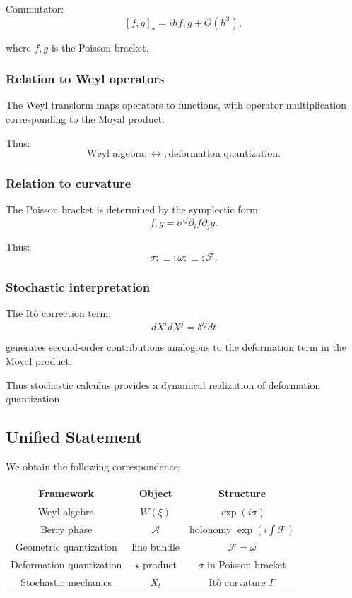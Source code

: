 \documentclass[11pt]{article}
\begin{document}
Commutator:
\[
[f,g]_\star = i\hbar {f,g} + O(\hbar^3),
\]

where ${f,g}$ is the Poisson bracket.

\subsubsection{Relation to Weyl operators}

The Weyl transform maps operators to functions, with operator multiplication corresponding to the Moyal product.

Thus:
\[
\text{Weyl algebra} ;\leftrightarrow; \text{deformation quantization}.
\]

\subsubsection{Relation to curvature}

The Poisson bracket is determined by the symplectic form:
\[
{f,g} = \sigma^{ij} \partial_i f \partial_j g.
\]

Thus:
\[
\sigma ;\equiv; \omega ;\equiv; \mathcal{F}.
\]

\subsubsection{Stochastic interpretation}

The It\^o correction term:
\[
dX^i dX^j = \delta^{ij} dt
\]

generates second-order contributions analogous to the deformation term in the Moyal product.

Thus stochastic calculus provides a dynamical realization of deformation quantization.

\subsection{Unified Statement}

We obtain the following correspondence:

\begin{center}
\begin{tabular}{c|c|c}
Framework & Object & Structure \\
\hline
Weyl algebra & $W(\xi)$ & $\exp(i\sigma)$ \\
Berry phase & $\mathcal{A}$ & holonomy $\exp(i\int \mathcal{F})$ \\
Geometric quantization & line bundle & $\mathcal{F} = \omega$ \\
Deformation quantization & $\star$-product & $\sigma$ in Poisson bracket \\
Stochastic mechanics & $X_t$ & It\^o curvature $F$
\end{tabular}
\end{center}
\end{document}
